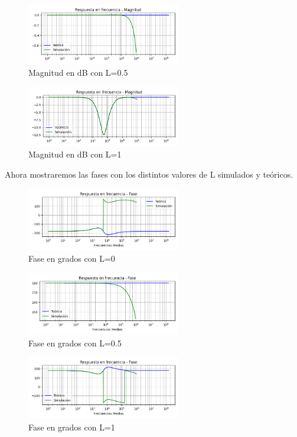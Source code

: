 \begin{figure}[H]
	\centering
	\includegraphics[width=0.6\textwidth]{../Ejercicio4-EcualizadorDeFase/Informe/highFrecL050Mag.png} 
	\caption{Magnitud en dB con L=0.5}
	\label{highMagL05}
\end{figure}

\begin{figure}[H]
	\centering
	\includegraphics[width=0.6\textwidth]{../Ejercicio4-EcualizadorDeFase/Informe/highFrecL100Mag.png} 
	\caption{Magnitud en dB con L=1}
	\label{highMagL10}
\end{figure}


Ahora mostraremos las fases con los distintos valores de L simulados y teóricos.

\begin{figure}[H]
	\centering
	\includegraphics[width=0.6\textwidth]{../Ejercicio4-EcualizadorDeFase/Informe/highFrecL000Fase.png} 
	\caption{Fase en grados con L=0}
	\label{highFaseL00}
\end{figure}
	
\begin{figure}[H]
	\centering
	\includegraphics[width=0.6\textwidth]{../Ejercicio4-EcualizadorDeFase/Informe/highFrecL050Fase.png} 
	\caption{Fase en grados con L=0.5}
	\label{highFaseL05}
\end{figure}

\begin{figure}[H]
	\centering
	\includegraphics[width=0.6\textwidth]{../Ejercicio4-EcualizadorDeFase/Informe/highFrecL100Fase.png} 
	\caption{Fase en grados con L=1}
	\label{highFaseL10}
\end{figure}

